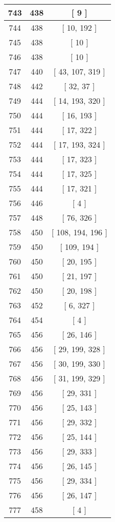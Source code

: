 \begin{center}
\begin{longtable}[H]{|| c c c ||}
\hline
743 & 438 & [ 9 ] \\ 
\hline
744 & 438 & [ 10, 192 ] \\ 
\hline
745 & 438 & [ 10 ] \\ 
\hline
746 & 438 & [ 10 ] \\ 
\hline
747 & 440 & [ 43, 107, 319 ] \\ 
\hline
748 & 442 & [ 32, 37 ] \\ 
\hline
749 & 444 & [ 14, 193, 320 ] \\ 
\hline
750 & 444 & [ 16, 193 ] \\ 
\hline
751 & 444 & [ 17, 322 ] \\ 
\hline
752 & 444 & [ 17, 193, 324 ] \\ 
\hline
753 & 444 & [ 17, 323 ] \\ 
\hline
754 & 444 & [ 17, 325 ] \\ 
\hline
755 & 444 & [ 17, 321 ] \\ 
\hline
756 & 446 & [ 4 ] \\ 
\hline
757 & 448 & [ 76, 326 ] \\ 
\hline
758 & 450 & [ 108, 194, 196 ] \\ 
\hline
759 & 450 & [ 109, 194 ] \\ 
\hline
760 & 450 & [ 20, 195 ] \\ 
\hline
761 & 450 & [ 21, 197 ] \\ 
\hline
762 & 450 & [ 20, 198 ] \\ 
\hline
763 & 452 & [ 6, 327 ] \\ 
\hline
764 & 454 & [ 4 ] \\ 
\hline
765 & 456 & [ 26, 146 ] \\ 
\hline
766 & 456 & [ 29, 199, 328 ] \\ 
\hline
767 & 456 & [ 30, 199, 330 ] \\ 
\hline
768 & 456 & [ 31, 199, 329 ] \\ 
\hline
769 & 456 & [ 29, 331 ] \\ 
\hline
770 & 456 & [ 25, 143 ] \\ 
\hline
771 & 456 & [ 29, 332 ] \\ 
\hline
772 & 456 & [ 25, 144 ] \\ 
\hline
773 & 456 & [ 29, 333 ] \\ 
\hline
774 & 456 & [ 26, 145 ] \\ 
\hline
775 & 456 & [ 29, 334 ] \\ 
\hline
776 & 456 & [ 26, 147 ] \\ 
\hline
777 & 458 & [ 4 ] \\ 

\end{longtable}
\end{center}
